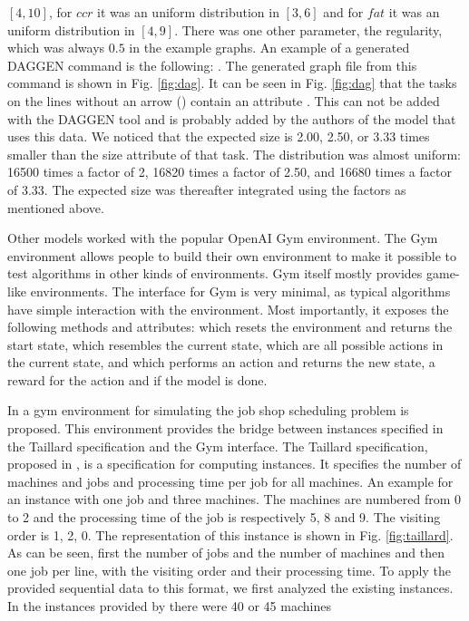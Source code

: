 $[4, 10]$, for $ccr$ it was an uniform distribution in $[3, 6]$ and for $fat$
it was an uniform distribution in $[4, 9]$. There was one other parameter, the
regularity, which was always $0.5$ in the example graphs. An example of a
generated DAGGEN command is the following: . The generated graph file from this
command is shown in Fig. \ref{fig:dag}. It can be seen in Fig. \ref{fig:dag}
that the tasks on the lines without an arrow (\code{->}) contain an attribute
. This can not be added with the DAGGEN tool and is
probably added by the authors of the model that uses this data. We noticed
that the expected size is 2.00, 2.50, or 3.33 times smaller than the size
attribute of that task. The distribution was almost uniform: 16500 times a
factor of 2, 16820 times a factor of 2.50, and 16680 times a factor of 3.33.
The expected size was thereafter integrated using the factors as mentioned
above.




Other models worked with the popular OpenAI Gym environment. The Gym
environment allows people to build their own environment to make it possible
to test \rl algorithms in other kinds of environments. Gym itself mostly
provides game-like environments. The interface for Gym is very minimal, as
typical \rl algorithms have simple interaction with the environment. Most
importantly, it exposes the following methods and attributes:
 which resets the environment and returns the start state,
 which resembles the current state,
 which are all possible actions in the current state,
and  which performs an action and returns the new
state, a reward for the action and if the model is done.

In  a gym environment for simulating the job shop scheduling
problem is proposed. This environment provides the bridge between instances
specified in the Taillard specification and the Gym interface. The Taillard
specification, proposed in , is a specification for
computing instances. It specifies the number of machines and jobs and
processing time per job for all machines. An example for an instance with one
job and three machines. The machines are numbered from 0 to 2 and the
processing time of the job is respectively 5, 8 and 9. The visiting order is
1, 2, 0. The representation of this instance is shown in Fig.
\ref{fig:taillard}. As can be seen, first the number of jobs and the number of
machines and then one job per line, with the visiting order and their
processing time. To apply the provided sequential data to this format, we
first analyzed the existing instances. In the instances provided by
 there were 40 or 45
machines

